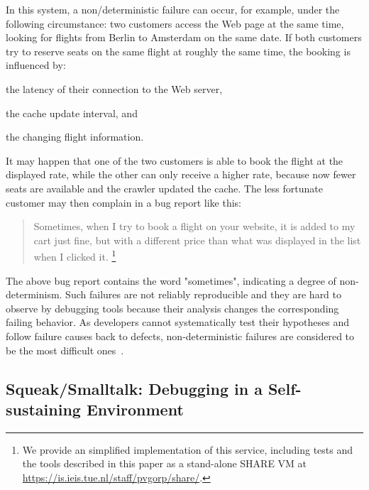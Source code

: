 \documentclass[preprint,3p]{elsarticle}
\begin{document}
In this system, a non\-/deterministic failure can occur, for example, under the following circumstance: 
	two customers access the Web page at the same time, looking for flights from Berlin to Amsterdam on the same date. 
If both customers try to reserve seats on the same flight at roughly the same time, the booking is influenced by:
\begin{inparaenum}
\item the latency of their connection to the Web server,
\item the cache update interval, and
\item the changing flight information.
\end{inparaenum}
It may happen that one of the two customers is able to book the flight at the displayed rate, while the other can only receive a higher rate,
because now fewer seats are available and the crawler updated the cache. 
The less fortunate customer may then complain in a bug report like this:

\begin{quote}
\label{quote:bugreport}
Sometimes, when I try to book a flight on your website, it is added to
my cart just fine, but with a different price than what was displayed
in the list when I clicked it.%
\footnote{We provide an simplified implementation of this service,
  including tests and the tools described in this paper as a
  stand-alone \textsc{SHARE}\cite{van2011share} \textsc{VM} at
  \url{https://is.ieis.tue.nl/staff/pvgorp/share/}.}
\end{quote}

The above bug report contains the word "sometimes", indicating a degree of non-determinism. 
Such failures are not reliably reproducible and they are hard to observe by debugging tools because their analysis changes the corresponding failing behavior.
As developers cannot systematically test their hypotheses and follow failure causes back to defects, non-deterministic  failures are considered to be the most difficult ones~\cite{zeller2009programs}.





\subsection{Squeak/Smalltalk: Debugging in a Self-sustaining Environment}
\end{document}
